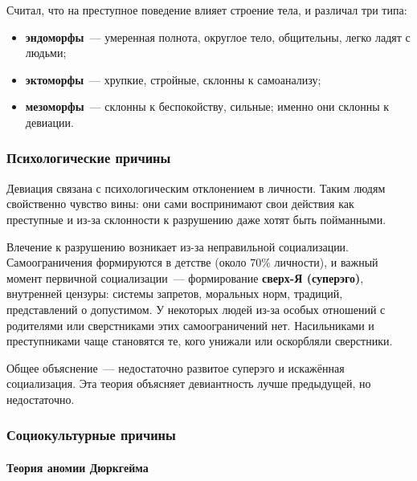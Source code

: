 \documentclass[12pt]{article}
\begin{document}
	\begin{person}
		Считал, что на преступное поведение влияет строение тела, и различал три типа:
		\begin{itemize}
			\item \textbf{эндоморфы}~--- умеренная полнота, округлое тело, общительны, легко ладят с людьми;
			\item \textbf{эктоморфы}~--- хрупкие, стройные, склонны к самоанализу;
			\item \textbf{мезоморфы}~--- склонны к беспокойству, сильные; именно они склонны к девиации.
		\end{itemize}
	\end{person}

	\subsubsection{Психологические причины}

	\begin{person}
		Девиация связана с психологическим отклонением в личности. Таким людям свойственно чувство вины: они сами воспринимают свои действия как преступные и из-за склонности к разрушению даже хотят быть пойманными.

		Влечение к разрушению возникает из-за неправильной социализации. Самоограничения формируются в детстве (около $70\%$ личности), и важный момент первичной социализации~--- формирование \textbf{сверх-Я (суперэго)}, внутренней цензуры: системы запретов, моральных норм, традиций, представлений о допустимом. У некоторых людей из-за особых отношений с родителями или сверстниками этих самоограничений нет. Насильниками и преступниками чаще становятся те, кого унижали или оскорбляли сверстники.
	\end{person}

	\begin{note}
		Общее объяснение~--- недостаточно развитое суперэго и искажённая социализация. Эта теория объясняет девиантность лучше предыдущей, но недостаточно.
	\end{note}

	\subsubsection{Социокультурные причины}

	\paragraph{Теория аномии Дюркгейма}
\end{document}
